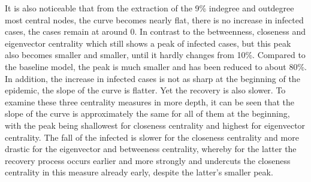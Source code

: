 \documentclass{Resources/netsci-project}
\begin{document}
It is also noticeable that from the extraction of the 9\% indegree and outdegree most central nodes, the curve becomes nearly flat, there is no increase in infected cases, the cases remain at around 0. In contrast to the betweenness, closeness and eigenvector centrality which still shows a peak of infected cases, but this peak also becomes smaller and smaller, until it hardly changes from 10\%. Compared to the baseline model, the peak is much smaller and has been reduced to about 80\%. In addition, the increase in infected cases is not as sharp at the beginning of the epidemic, the slope of the curve is flatter. Yet the recovery is also slower. To examine these three centrality measures in more depth, it can be seen that the slope of the curve is approximately the same for all of them at the beginning, with the peak being shallowest for closeness centrality and highest for eigenvector centrality. The fall of the infected is slower for the closeness centrality and more drastic for the eigenvector and betweeness centrality, whereby for the latter the recovery process occurs earlier and more strongly and undercuts the closeness centrality in this measure already early, despite the latter’s smaller peak.
\end{document}
